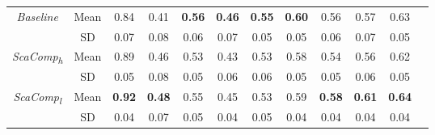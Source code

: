 \documentclass[11pt]{article}
\begin{document}
\begin{center}
\begin{tabular}{ |c|c|c|c|c|c|c|c|c|c|c|c| }
\hline
\multirow{2}{5em}{\textit{Baseline}} & Mean & 0.84 & 0.41 & \textbf{0.56} & \textbf{0.46} & \textbf{0.55} & \textbf{0.60} & 0.56 & 0.57 & 0.63 \\ 
\hhline{||~|-|-|-|-|-|-|-|-|-|-|-||}
& SD & 0.07 & 0.08 & 0.06 & 0.07 & 0.05 & 0.05 & 0.06 & 0.07 & 0.05 \\  
\hline
\hline
\multirow{2}{5em}{\textit{ScaComp\textsubscript{h}}} & Mean & 0.89 & 0.46 & 0.53 & 0.43 & 0.53 & 0.58 & 0.54 & 0.56 & 0.62 \\ 
\hhline{||~|-|-|-|-|-|-|-|-|-|-|-||}
& SD & 0.05 & 0.08 & 0.05 & 0.06 & 0.06 & 0.05 & 0.05 & 0.06 & 0.05 \\  
\hline
\hline
\multirow{2}{5em}{\textit{ScaComp\textsubscript{l}}} & Mean & \textbf{0.92} & \textbf{0.48}& 0.55 & 0.45 & 0.53 & 0.59 & \textbf{0.58} & \textbf{0.61} & \textbf{0.64} \\ 
\hhline{||~|-|-|-|-|-|-|-|-|-|-|-||}
& SD & 0.04 & 0.07 & 0.05 & 0.04 & 0.05 & 0.04 & 0.04 & 0.04 & 0.04 \\  
\hline
\end{tabular}
\end{center}
\end{document}

